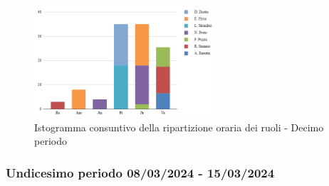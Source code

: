 \begin{figure}[H]
    \centering
    \includegraphics[width=0.6\textwidth]{../Images/consuntivoDivisioneRuoli10Periodo.png}
    \caption{Istogramma consuntivo della ripartizione oraria dei ruoli - Decimo periodo}
    \label{fig:Consuntivo_ripartizione_oraria_10}
\end{figure}


\subsubsection{Undicesimo periodo  08/03/2024 - 15/03/2024}

